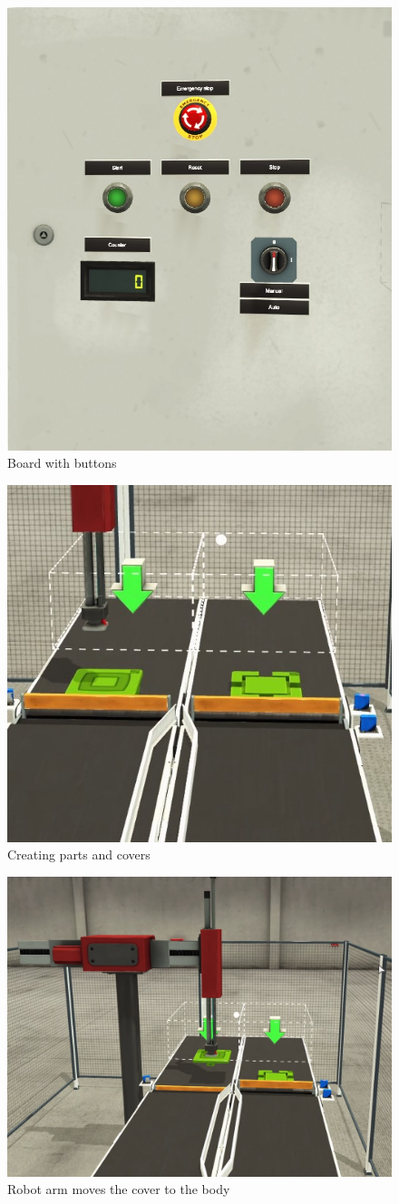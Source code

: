 \begin{figure}[H]
    \centering
    \includegraphics[width=0.65\columnwidth]{imgs/io/5.jpg}
    \caption[Board with buttons]{Board with buttons}
    \label{fig-magnitude}
\end{figure}%
\begin{figure}[H]
    \centering
    \includegraphics[width=0.65\columnwidth]{imgs/io/9.jpg}
    \caption[Creating parts and covers]{Creating parts and covers}
    \label{fig-magnitude}
\end{figure}%
\begin{figure}[H]
    \centering
    \includegraphics[width=0.8\columnwidth]{imgs/io/8.jpg}
    \caption[Robot arm moves the cover to the body]{Robot arm moves the cover to the body}
    \label{fig-magnitude}
\end{figure}%
